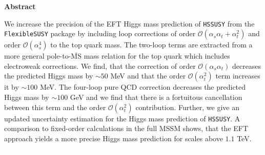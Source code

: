 \documentclass[a4paper,12pt]{book}
\begin{document}
\begin{center}
\textbf{Abstract}\\
\end{center} 
We increase the precision of the EFT Higgs mass prediction of \texttt{HSSUSY} from the \texttt{FlexibleSUSY} package by including loop corrections of order $\mathcal{O}(\alpha_s\alpha_t+\alpha_t^2)$ and order $\mathcal{O}(\alpha_s^4)$ to the top quark mass. The two-loop terms are extracted from a more general pole-to-$\overline{\text{MS}}$ mass relation for the top quark which includes electroweak corrections. We find, that the correction of order $\mathcal{O}(\alpha_s\alpha_t)$ decreases the predicted Higgs mass by $\sim 50$ MeV and that the order $\mathcal{O}(\alpha_t^2)$ term increases it by $\sim 100$ MeV. The four-loop pure QCD correction decreases the predicted Higgs mass by $\sim 100$ GeV and we find that there is a fortuitous cancellation between this term and the order $\mathcal{O}(\alpha_t^2)$ contribution. Further, we give an updated uncertainty estimation for the Higgs mass prediction of \texttt{HSSUSY}. %
A comparison to fixed-order calculations in the full MSSM shows, that the EFT approach yields a more precise Higgs mass prediction for scales above $1.1$ TeV. %
\thispagestyle{empty}
\clearpage
\textcolor{white}{nichts}
\thispagestyle{empty}
\clearpage

\pagestyle{scrheadings}
\clearscrheadfoot
\ohead{\headmark}
\ifoot{}
\cfoot{}
\ofoot{\pagemark}
\tableofcontents
\clearpage
\thispagestyle{empty}
\clearpage
{}
\end{document}
